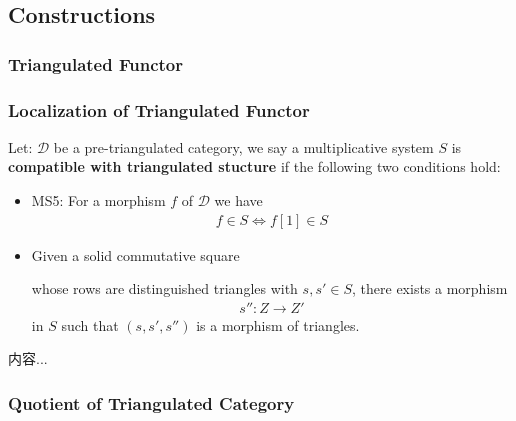 \documentclass[Total.tex]{subfiles}
\begin{document}
			\subsection{Constructions}
			\subsubsection{Triangulated Functor}
			\subsubsection{Localization of Triangulated Functor}
				\begin{Def}
					Let: $\mathcal{D}$ be a pre-triangulated category, we say a multiplicative system $S$ is \textbf{compatible with triangulated stucture} if the following two conditions hold:
					\begin{itemize}
						\item MS5: For a morphism $f$ of $\mathcal{D}$ we have
						\begin{gather*}
							f\in S\Leftrightarrow f[1]\in S
						\end{gather*}
						\item Given a solid commutative square
						\begin{center}
						\end{center}
						whose rows are distinguished triangles with $s,s'\in S$, there exists a morphism
						\begin{gather*}
							s'':Z\rightarrow Z'
						\end{gather*}
						in $S$ such that $(s,s',s'')$ is a morphism of triangles.
					\end{itemize}
				\end{Def}
				\begin{lemma}
					内容...
				\end{lemma}
			\subsubsection{Quotient of Triangulated Category}
			\begin{lemma}
				
			\end{lemma}
\end{document}
